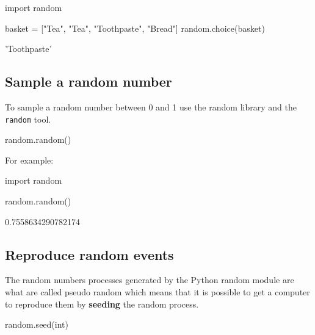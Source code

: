 \begin{pyin}
import random

basket = ["Tea", "Tea", "Toothpaste", "Bread"]
random.choice(basket)
\end{pyin}





\begin{raw}
'Toothpaste'
\end{raw}






\subsection{Sample a random number}
\label{\detokenize{tools-for-mathematics/06-probability/how/main:sample-a-random-number}}

To sample a random number between 0 and 1 use the random library and the
\texttt{random} tool.


\begin{pyin}
random.random()
\end{pyin}



For example:





\begin{pyin}
import random

random.random()
\end{pyin}





\begin{raw}
0.7558634290782174
\end{raw}






\subsection{Reproduce random events}
\label{\detokenize{tools-for-mathematics/06-probability/how/main:reproduce-random-events}}\label{\detokenize{tools-for-mathematics/06-probability/how/main:id4}}

The random numbers processes generated by the Python random module are what are
called pseudo random which means that it is possible to get a computer to reproduce them by
\textbf{seeding} the random process.


\begin{pyin}
random.seed(int)
\end{pyin}





